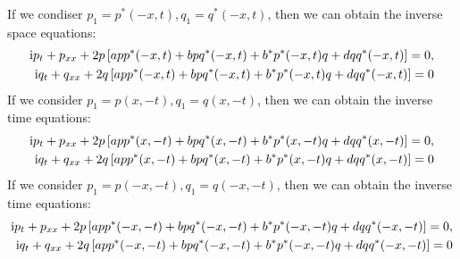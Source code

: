 If we condiser $ p_{1} = p^{*}(-x,t), q_{1} = q^{*}(-x,t) $, then we can obtain the inverse space equations:
\begin{align}
    \mathrm{i} p_{t} + p_{xx} + 2p \left[ app^{*}(-x,t) + bpq^{*}(-x,t) + b^{*}p^{*}(-x,t)q + dqq^{*}(-x,t) \right] = 0, \label{eq:AKNS-inverse-x}\\
    \mathrm{i} q_{t} + q_{xx} + 2q \left[ app^{*}(-x,t) + bpq^{*}(-x,t) + b^{*}p^{*}(-x,t)q + dqq^{*}(-x,t) \right] = 0
\end{align}
If we consider $ p_{1} = p(x,-t), q_{1} = q(x,-t) $, then we can obtain the inverse time equations:
\begin{align}
    \mathrm{i} p_{t} + p_{xx} + 2p \left[ app^{*}(x,-t) + bpq^{*}(x,-t) + b^{*}p^{*}(x,-t)q + dqq^{*}(x,-t) \right] = 0, \label{eq:AKNS-inverse-t}\\
    \mathrm{i} q_{t} + q_{xx} + 2q \left[ app^{*}(x,-t) + bpq^{*}(x,-t) + b^{*}p^{*}(x,-t)q + dqq^{*}(x,-t) \right] = 0
\end{align}
If we consider $ p_{1} = p(-x,-t), q_{1} = q(-x,-t) $, then we can obtain the inverse time equations:
\begin{align}
    \mathrm{i} p_{t} + p_{xx} + 2p \left[ app^{*}(-x,-t) + bpq^{*}(-x,-t) + b^{*}p^{*}(-x,-t)q + dqq^{*}(-x,-t) \right] = 0, \label{eq:AKNS-inverse-x-t}\\
    \mathrm{i} q_{t} + q_{xx} + 2q \left[ app^{*}(-x,-t) + bpq^{*}(-x,-t) + b^{*}p^{*}(-x,-t)q + dqq^{*}(-x,-t) \right] = 0
\end{align}

